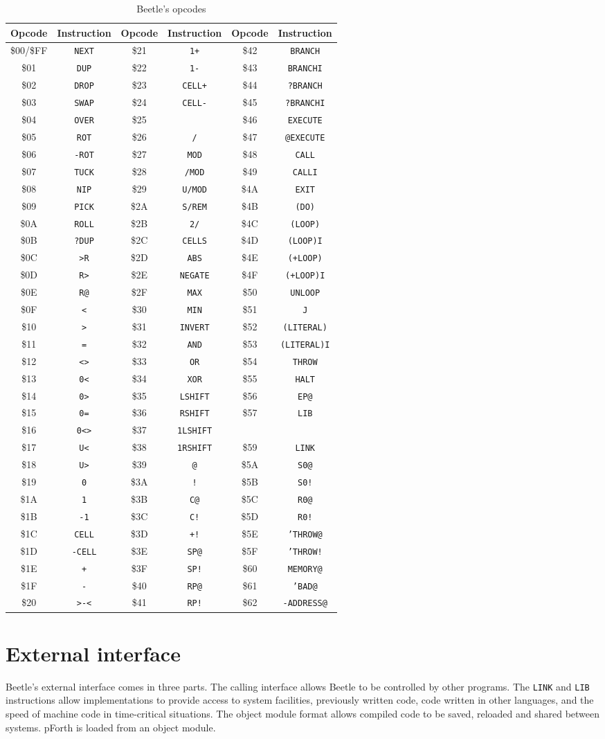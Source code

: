 \documentclass{article}
\newcommand{\opcodetbl}[6]{\$#1 & {\tt #2} & \$#3 & {\tt #4} & \$#5 & {\tt #6}
\\}
\newcommand{\opcodetbltwo}[4]{\$#1 & {\tt #2} & \$#3 & {\tt #4} \\}
\begin{document}
\begin{table}[htb]
\begin{center}
\begin{tabular}{*{3}{cc}} \toprule
\bf Opcode & \bf Instruction & \bf Opcode & \bf
    Instruction & \bf Opcode & \bf Instruction \\ \midrule
\opcodetbl{00/\$FF}{NEXT}	{21}{1+}	{42}{BRANCH}
\opcodetbl{01}{DUP}	{22}{1-}	{43}{BRANCHI}
\opcodetbl{02}{DROP}	{23}{CELL+}	{44}{?BRANCH}
\opcodetbl{03}{SWAP}	{24}{CELL-}	{45}{?BRANCHI}
\opcodetbl{04}{OVER}	{25}{*}		{46}{EXECUTE}
\opcodetbl{05}{ROT}	{26}{/}		{47}{@EXECUTE}
\opcodetbl{06}{-ROT}	{27}{MOD}	{48}{CALL}
\opcodetbl{07}{TUCK}	{28}{/MOD}	{49}{CALLI}
\opcodetbl{08}{NIP}	{29}{U/MOD}	{4A}{EXIT}
\opcodetbl{09}{PICK}	{2A}{S/REM}	{4B}{(DO)}
\opcodetbl{0A}{ROLL}	{2B}{2/}	{4C}{(LOOP)}
\opcodetbl{0B}{?DUP}	{2C}{CELLS}	{4D}{(LOOP)I}
\opcodetbl{0C}{>R}	{2D}{ABS}	{4E}{(+LOOP)}
\opcodetbl{0D}{R>}	{2E}{NEGATE}	{4F}{(+LOOP)I}
\opcodetbl{0E}{R@}	{2F}{MAX}	{50}{UNLOOP}
\opcodetbl{0F}{<}	{30}{MIN}	{51}{J}
\opcodetbl{10}{>}	{31}{INVERT}	{52}{(LITERAL)}
\opcodetbl{11}{=}	{32}{AND}	{53}{(LITERAL)I}
\opcodetbl{12}{<>}	{33}{OR}	{54}{THROW}
\opcodetbl{13}{0<}	{34}{XOR}	{55}{HALT}
\opcodetbl{14}{0>}	{35}{LSHIFT}	{56}{EP@}
\opcodetbl{15}{0=}	{36}{RSHIFT}	{57}{LIB}
\opcodetbltwo{16}{0<>}	{37}{1LSHIFT}
\opcodetbl{17}{U<}	{38}{1RSHIFT}	{59}{LINK}
\opcodetbl{18}{U>}	{39}{@}		{5A}{S0@}
\opcodetbl{19}{0}	{3A}{!}		{5B}{S0!}
\opcodetbl{1A}{1}	{3B}{C@}	{5C}{R0@}
\opcodetbl{1B}{-1}	{3C}{C!}        {5D}{R0!}
\opcodetbl{1C}{CELL}	{3D}{+!}        {5E}{'THROW@}
\opcodetbl{1D}{-CELL}	{3E}{SP@}	{5F}{'THROW!}
\opcodetbl{1E}{+}	{3F}{SP!}       {60}{MEMORY@}
\opcodetbl{1F}{-}	{40}{RP@}       {61}{'BAD@}
\opcodetbl{20}{>-<}	{41}{RP!}       {62}{-ADDRESS@}
 \bottomrule
\end{tabular}
\caption{\label{opcodetable}Beetle's opcodes}
\end{center}
\end{table}


\section{External interface}

Beetle's external interface comes in three parts. The calling interface allows
Beetle to be controlled by other programs. The {\tt LINK} and {\tt LIB} instructions allow
implementations to provide access to system facilities, previously written code,
code written in other languages, and the speed of machine code in time-critical
situations. The object module format allows compiled code to be saved, reloaded
and shared between systems. pForth is loaded from an object module.
\end{document}
